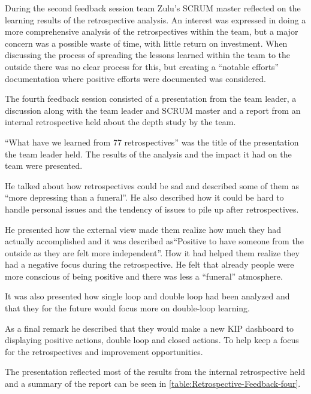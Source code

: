 During the second feedback session team Zulu's SCRUM master reflected on the learning results of the retrospective analysis. An interest was expressed in doing a more comprehensive analysis of the retrospectives within the team, but a major concern was a possible waste of time, with little return on investment. When discussing the process of spreading the lessons learned within the team to the outside there was no clear process for this, but creating a ``notable efforts'' documentation where positive efforts were documented was considered. 

The fourth feedback session consisted of a presentation from the team leader, a discussion along with the team leader and SCRUM master and a report from an internal retrospective held about the depth study by the team. 

``What have we learned from 77 retrospectives'' was the title of the presentation the team leader held. The results of the analysis and the impact it had on the team were presented. 

He talked about how retrospectives could be sad and described some of them as ``more depressing than a funeral''. He also described how it could be hard to handle personal issues and the tendency of issues to pile up after retrospectives. 

He presented how the external view made them realize how much they had actually accomplished and it was described as``Positive to have someone from the outside as they are felt more independent''. How it had helped them realize they had a negative focus during the retrospective. He felt that already people were more conscious of being positive and there was less a ``funeral'' atmosphere.  

It was also presented how single loop and double loop had been analyzed and that they for the future would focus more on double-loop learning. 

As a final remark he described that they would make a new KIP dashboard to displaying positive actions, double loop and closed actions. To help keep a focus for the retrospectives and improvement opportunities.

The presentation reflected most of the results from the internal retrospective held and a summary of the report can be seen in \autoref{table:Retrospective-Feedback-four}. 

